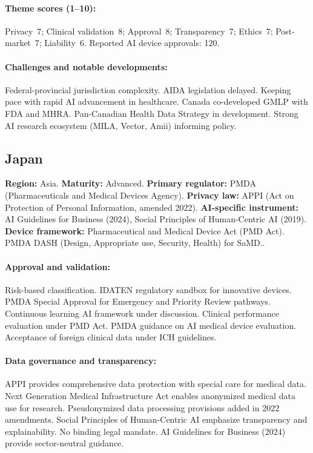 {\paragraph{Theme scores (1--10):}
Privacy~7;
Clinical validation~8;
Approval~8;
Transparency~7;
Ethics~7;
Post-market~7;
Liability~6.
Reported AI device approvals: 120.

\paragraph{Challenges and notable developments:}
Federal-provincial jurisdiction complexity. AIDA legislation delayed. Keeping pace with rapid AI advancement in healthcare.
Canada co-developed GMLP with FDA and MHRA. Pan-Canadian Health Data Strategy in development. Strong AI research ecosystem (MILA, Vector, Amii) informing policy.


\subsection{Japan}
\textbf{Region:} Asia.
\textbf{Maturity:} Advanced.
\textbf{Primary regulator:} PMDA (Pharmaceuticals and Medical Devices Agency).
\textbf{Privacy law:} APPI (Act on Protection of Personal Information, amended 2022).
\textbf{AI-specific instrument:} AI Guidelines for Business (2024), Social Principles of Human-Centric AI (2019).
\textbf{Device framework:} Pharmaceutical and Medical Device Act (PMD Act). PMDA DASH (Design, Appropriate use, Security, Health) for SaMD..

\paragraph{Approval and validation:}
Risk-based classification. IDATEN regulatory sandbox for innovative devices. PMDA Special Approval for Emergency and Priority Review pathways. Continuous learning AI framework under discussion.
Clinical performance evaluation under PMD Act. PMDA guidance on AI medical device evaluation. Acceptance of foreign clinical data under ICH guidelines.

\paragraph{Data governance and transparency:}
APPI provides comprehensive data protection with special care for medical data. Next Generation Medical Infrastructure Act enables anonymized medical data use for research. Pseudonymized data processing provisions added in 2022 amendments.
Social Principles of Human-Centric AI emphasize transparency and explainability. No binding legal mandate. AI Guidelines for Business (2024) provide sector-neutral guidance.

}
